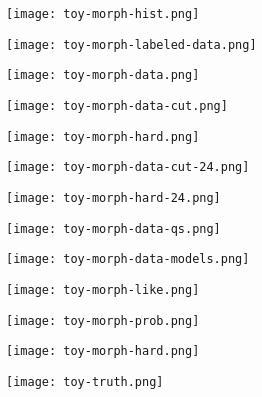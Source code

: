 \documentclass{beamer}
\begin{document}
\begin{frame}
\texttt{[image: toy-morph-hist.png]}
\end{frame}

\begin{frame}
\texttt{[image: toy-morph-labeled-data.png]}
\end{frame}

\begin{frame}
\texttt{[image: toy-morph-data.png]}
\end{frame}

\begin{frame}
\texttt{[image: toy-morph-data-cut.png]}
\end{frame}

\begin{frame}
\texttt{[image: toy-morph-hard.png]}
\end{frame}

\begin{frame}
\texttt{[image: toy-morph-data-cut-24.png]}
\end{frame}

\begin{frame}
\texttt{[image: toy-morph-hard-24.png]}
\end{frame}

\begin{frame}
\texttt{[image: toy-morph-data-qs.png]}
\end{frame}

\begin{frame}
\texttt{[image: toy-morph-data-models.png]}
\end{frame}

\begin{frame}
\texttt{[image: toy-morph-like.png]}
\end{frame}

\begin{frame}
\texttt{[image: toy-morph-prob.png]}
\end{frame}

\begin{frame}
\texttt{[image: toy-morph-hard.png]}
\end{frame}

\begin{frame}
\texttt{[image: toy-truth.png]}
\end{frame}
\end{document}
